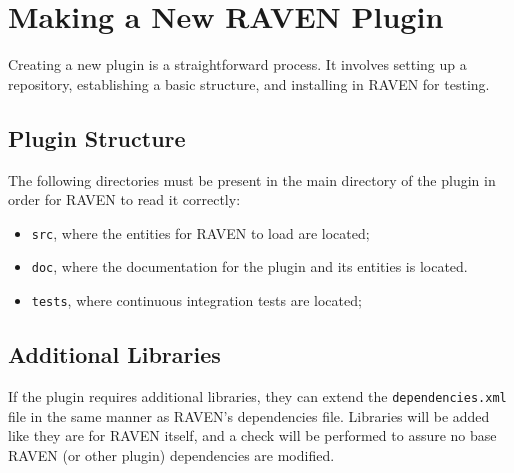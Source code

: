 \section{Making a New RAVEN Plugin}

Creating a new plugin is a straightforward process. It involves setting up a repository,
establishing a basic structure, and installing in RAVEN for testing.


\subsection{Plugin Structure}
The following directories must be present in the main directory of the plugin in order for RAVEN to
read it correctly:
\begin{itemize}
  \item \texttt{src}, where the entities for RAVEN to load are located;
  \item \texttt{doc}, where the documentation for the plugin and its entities is located.
  \item \texttt{tests}, where continuous integration tests are located;
\end{itemize}

\subsection{Additional Libraries}
If the plugin requires additional libraries, they can extend the \texttt{dependencies.xml} file in
the same manner as RAVEN's dependencies file. Libraries will be added like they are for RAVEN
itself, and a check will be performed to assure no base RAVEN (or other plugin) dependencies are
modified.


